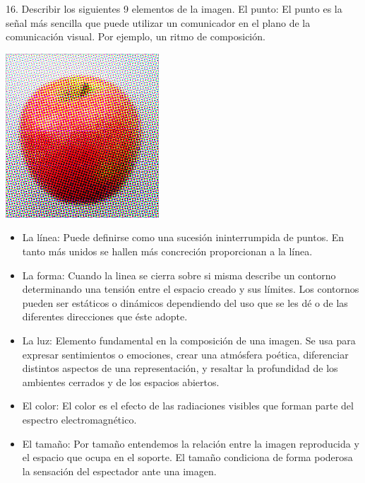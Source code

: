 \documentclass{beamer}
\begin{document}
\begin{frame}
\begin{block}{16. Describir los siguientes 9 elementos de la imagen.}
El punto: El punto es la señal más sencilla que puede utilizar un comunicador en el plano de la comunicación visual. Por ejemplo, un ritmo de composición.
\begin{center}
\includegraphics[scale = 0.5]{10.jpeg}
\end{center}
\end{block}
\end{frame}

\begin{frame}
\begin{block}{}
\begin{itemize}
    \item La línea: Puede definirse como una sucesión ininterrumpida de puntos. En tanto más unidos se hallen más concreción proporcionan a la línea.
    \item La forma: Cuando la linea se cierra sobre si misma describe un contorno determinando una tensión entre el espacio creado y sus límites. Los contornos pueden ser estáticos o dinámicos dependiendo del uso que se les dé o de las diferentes direcciones que éste adopte.
\end{itemize}
\end{block}
\end{frame}

\begin{frame}
\begin{block}{}
\begin{itemize}
    \item La luz: Elemento fundamental en la composición de una imagen. Se usa para expresar sentimientos o emociones, crear una atmósfera poética, diferenciar distintos aspectos de una representación, y resaltar la profundidad de los ambientes cerrados y de los espacios abiertos.
    \item El color: El color es el efecto de las radiaciones visibles que forman parte del espectro electromagnético.
    \item El tamaño: Por tamaño entendemos la relación entre la imagen reproducida y el espacio que ocupa en el soporte. El tamaño condiciona de forma poderosa la sensación del espectador ante una imagen.
\end{itemize}
\end{block}
\end{frame}
\end{document}
